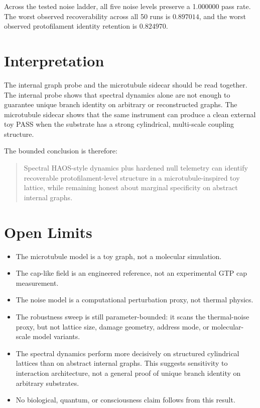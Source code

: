\documentclass[11pt]{article}
\begin{document}
Across the tested noise ladder, all five noise levels preserve a 1.000000 pass rate. The worst observed recoverability across all 50 runs is $0.897014$, and the worst observed protofilament identity retention is $0.824970$.

\section{Interpretation}

The internal graph probe and the microtubule sidecar should be read together. The internal probe shows that spectral dynamics alone are not enough to guarantee unique branch identity on arbitrary or reconstructed graphs. The microtubule sidecar shows that the same instrument can produce a clean external toy PASS when the substrate has a strong cylindrical, multi-scale coupling structure.

The bounded conclusion is therefore:
\begin{quote}
Spectral HAOS-style dynamics plus hardened null telemetry can identify recoverable protofilament-level structure in a microtubule-inspired toy lattice, while remaining honest about marginal specificity on abstract internal graphs.
\end{quote}

\section{Open Limits}

\begin{itemize}
\item The microtubule model is a toy graph, not a molecular simulation.
\item The cap-like field is an engineered reference, not an experimental GTP cap measurement.
\item The noise model is a computational perturbation proxy, not thermal physics.
\item The robustness sweep is still parameter-bounded: it scans the thermal-noise proxy, but not lattice size, damage geometry, address mode, or molecular-scale model variants.
\item The spectral dynamics perform more decisively on structured cylindrical lattices than on abstract internal graphs. This suggests sensitivity to interaction architecture, not a general proof of unique branch identity on arbitrary substrates.
\item No biological, quantum, or consciousness claim follows from this result.
\end{itemize}
\end{document}
